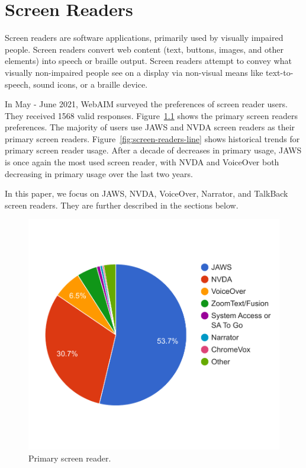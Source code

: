 %
%
% 
% 
% 


\chapter{Screen Readers}

Screen readers are software applications, primarily used by visually impaired people. Screen readers convert web content (text, buttons, images, and other elements) into speech or braille output. Screen readers attempt to convey what visually non-impaired people see on a display via non-visual means like text-to-speech, sound icons, or a braille device.

In May - June 2021, WebAIM surveyed the  preferences of screen reader users. They received 1568 valid responses. Figure~\ref{fig:screen-readers-piechart} shows the primary screen readers preferences. The majority of users use JAWS and NVDA screen readers as their primary screen readers. Figure~\ref{fig:screen-readers-line} shows historical trends for primary screen reader usage. After a decade of decreases in primary usage, JAWS is once again the most used screen reader, with NVDA and VoiceOver both decreasing in primary usage over the last two years.

In this paper, we focus on JAWS, NVDA, VoiceOver, Narrator, and TalkBack screen readers. They are further described in the sections below.

\begin{figure}[tp]
\centering
\includegraphics[keepaspectratio,width=\linewidth,height=\halfh]
{images/screen-readers-piechart.pdf}

\caption[Primary screen reader]{
Primary screen reader.
}
\label{fig:screen-readers-piechart}
\end{figure}

